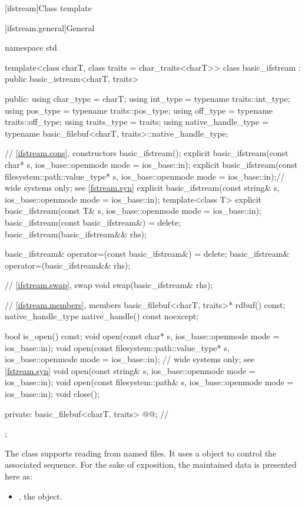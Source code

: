 [ifstream]{Class template }

[ifstream.general]{General}

%
\begin{codeblock}
namespace std {
  template<class charT, class traits = char_traits<charT>>
  class basic_ifstream : public basic_istream<charT, traits> {
  public:
    using char_type   = charT;
    using int_type    = typename traits::int_type;
    using pos_type    = typename traits::pos_type;
    using off_type    = typename traits::off_type;
    using traits_type = traits;
    using native_handle_type = typename basic_filebuf<charT, traits>::native_handle_type;

    // \ref{ifstream.cons}, constructors
    basic_ifstream();
    explicit basic_ifstream(const char* s,
                            ios_base::openmode mode = ios_base::in);
    explicit basic_ifstream(const filesystem::path::value_type* s,
                            ios_base::openmode mode = ios_base::in);// wide systems only; see \ref{fstream.syn}
    explicit basic_ifstream(const string& s,
                            ios_base::openmode mode = ios_base::in);
    template<class T>
      explicit basic_ifstream(const T& s, ios_base::openmode mode = ios_base::in);
    basic_ifstream(const basic_ifstream&) = delete;
    basic_ifstream(basic_ifstream&& rhs);

    basic_ifstream& operator=(const basic_ifstream&) = delete;
    basic_ifstream& operator=(basic_ifstream&& rhs);

    // \ref{ifstream.swap}, swap
    void swap(basic_ifstream& rhs);

    // \ref{ifstream.members}, members
    basic_filebuf<charT, traits>* rdbuf() const;
    native_handle_type native_handle() const noexcept;

    bool is_open() const;
    void open(const char* s, ios_base::openmode mode = ios_base::in);
    void open(const filesystem::path::value_type* s,
              ios_base::openmode mode = ios_base::in);  // wide systems only; see \ref{fstream.syn}
    void open(const string& s, ios_base::openmode mode = ios_base::in);
    void open(const filesystem::path& s, ios_base::openmode mode = ios_base::in);
    void close();

  private:
    basic_filebuf<charT, traits> @@;    // \expos
  };
}
\end{codeblock}

\pnum
The class
supports reading from named files.
It uses a
object to control the associated
sequence.
For the sake of exposition, the maintained data is presented here as:
\begin{itemize}
\item
{}, the  object.
\end{itemize}

